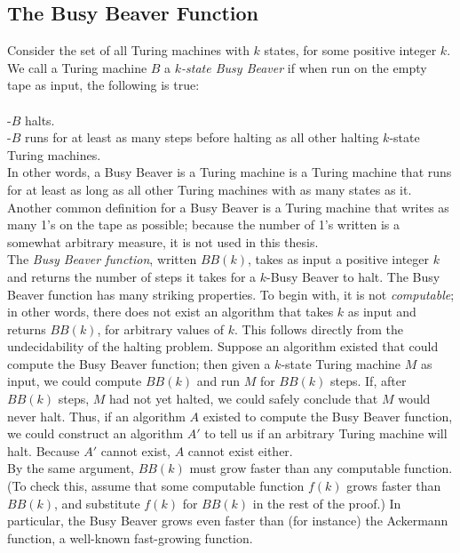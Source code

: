 \documentclass[11pt]{article}
\begin{document}
\subsection{The Busy Beaver Function}

Consider the set of all Turing machines with $k$ states, for some positive integer $k$. We call a Turing machine $B$ a $k$\emph{-state Busy Beaver} if when run on the empty tape as input, the following is true: \\ \\
-$B$ halts. \\
-$B$ runs for at least as many steps before halting as all other halting $k$-state Turing machines. \cite{busybeaver} \\

In other words, a Busy Beaver is a Turing machine is a Turing machine that runs for at least as long as all other Turing machines with as many states as it. Another common definition for a Busy Beaver is a Turing machine that writes as many 1's on the tape as possible; because the number of 1's written is a somewhat arbitrary measure, it is not used in this thesis. \\

The \emph{Busy Beaver function}, written $BB(k)$, takes as input a positive integer $k$ and returns the number of steps it takes for a $k$-Busy Beaver to halt. The Busy Beaver function has many striking properties. To begin with, it is not \emph{computable}; in other words, there does not exist an algorithm that takes $k$ as input and returns $BB(k)$, for arbitrary values of $k$. This follows directly from the undecidability of the halting problem. Suppose an algorithm existed that could compute the Busy Beaver function; then given a $k$-state Turing machine $M$ as input, we could compute $BB(k)$ and run $M$ for $BB(k)$ steps. If, after $BB(k)$ steps, $M$ had not yet halted, we could safely conclude that $M$ would never halt. Thus, if an algorithm $A$ existed to compute the Busy Beaver function, we could construct an algorithm $A'$ to tell us if an arbitrary Turing machine will halt. Because $A'$ cannot exist, $A$ cannot exist either. \\

By the same argument, $BB(k)$ must grow faster than any computable function. (To check this, assume that some computable function $f(k)$ grows faster than $BB(k)$, and substitute $f(k)$ for $BB(k)$ in the rest of the proof.) In particular, the Busy Beaver grows even faster than (for instance) the Ackermann function, a well-known fast-growing function. \\
\end{document}
